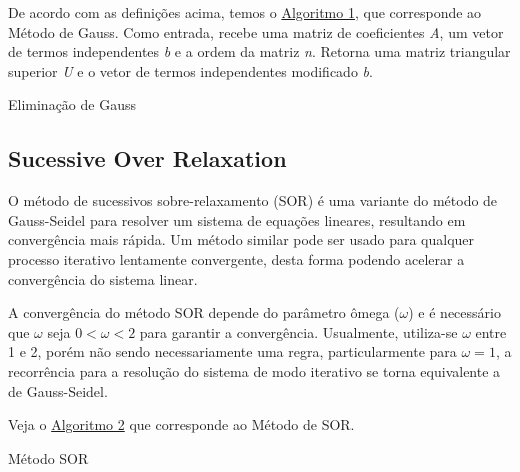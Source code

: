 \documentclass[
	article,			%
	11pt,				%
	oneside,			%
	a4paper,			%
	english,			%
	brazil,				%
	sumario=tradicional
	]{abntex2}
\begin{document}
De acordo com as definições acima, temos o \hyperlink{a1}{Algoritmo 1}, que corresponde ao Método de Gauss. Como entrada, recebe uma matriz de coeficientes \textit{A}, um vetor de termos independentes \textit{b} e a ordem da matriz \textit{n}. Retorna uma matriz triangular superior \textit{U} e o vetor de termos independentes modificado \textit{b}.

\hypertarget{a1}{
\begin{algorithm}
	\caption{Eliminação de Gauss}
\end{algorithm}
}

\subsection{Sucessive Over Relaxation}
O método de sucessivos sobre-relaxamento (SOR) é uma variante do método de Gauss-Seidel para resolver um sistema de equações lineares, resultando em convergência mais rápida. Um método similar pode ser usado para qualquer processo iterativo lentamente convergente, desta forma podendo acelerar a convergência do sistema linear.

A convergência do método SOR depende do parâmetro ômega ($\omega$) e é necessário que $\omega$ seja $0 < \omega < 2$ para garantir a convergência. Usualmente, utiliza-se $\omega$ entre 1 e 2, porém não sendo necessariamente uma regra, particularmente para $\omega = 1$, a recorrência para a resolução do sistema de modo iterativo se torna equivalente a de Gauss-Seidel.

Veja o \hyperlink{a2}{Algoritmo 2} que corresponde ao Método de SOR.

\hypertarget{a2}{
\begin{algorithm}
	\caption{Método SOR}
\end{algorithm}
}
\end{document}
